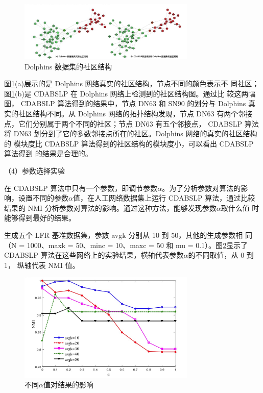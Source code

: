 \begin{figure}
  \centering
  \includegraphics[width=0.75\textwidth]{figures/Dolphins}
  \caption{Dolphins 数据集的社区结构}\label{fig:Dolphins}
\end{figure}

图\ref{fig:Dolphins}(a)展示的是 Dolphins 网络真实的社区结构，节点不同的颜色表示不
同社区；图\ref{fig:Dolphins}(b)是 CDABSLP 在 Dolphins 网络上检测到的社区结构图。通过比
较这两幅图， CDABSLP 算法得到的结果中，节点 DN63 和 SN90 的划分与 Dolphins
真实的社区结构不同。从 Dolphins 网络的拓扑结构发现，节点 DN63 有两个邻接
点，它们分别属于两个不同的社区；节点 DN63 有五个邻接点， CDABSLP 算法将
DN63 划分到了它的多数邻接点所在的社区。Dolphins 网络的真实的社区结构的
模块度比 CDABSLP 算法得到的社区结构的模块度小，可以看出 CDABSLP 算法得到
的结果是合理的。

（4）参数选择实验

在 CDABSLP 算法中只有一个参数，即调节参数$\alpha$。为了分析参数对算法的影
响，设置不同的参数$\alpha$值，在人工网络数据集上运行 CDABSLP 算法，通过比较
结果的 NMI 分析参数对算法的影响。通过这种方法，能够发现参数$\alpha$取什么值
时能够得到最好的结果。

生成五个 LFR 基准数据集，参数 avgk 分别从 10 到 50，其他的生成参数相
同（N = 1000、maxk = 50、minc = 10、maxc = 50 和 mu = 0.1）。图\ref{fig:alpha}显示了
CDABSLP 算法在这些网络上的实验结果，横轴代表参数$\alpha$的不同取值，从 0 到 1，
纵轴代表 NMI 值。

\begin{figure}
  \centering
  \includegraphics[width=0.75\textwidth]{figures/alpha}
  \caption{不同$\alpha$值对结果的影响}\label{fig:alpha}
\end{figure}

